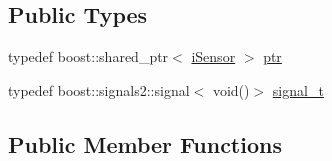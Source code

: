 \subsection*{Public Types}
\begin{DoxyCompactItemize}
\item 
typedef boost\+::shared\+\_\+ptr$<$ \hyperlink{classo_cpt_1_1i_sensor}{i\+Sensor} $>$ \hyperlink{classo_cpt_1_1i_sensor_a03533d2c5dc66e332d70dbb3b5e3006a}{ptr}
\item 
typedef boost\+::signals2\+::signal$<$ void()$>$ \hyperlink{classo_cpt_1_1i_sensor_a2e6d170acbc05f0b557bb68671813f6d}{signal\+\_\+t}
\end{DoxyCompactItemize}
\subsection*{Public Member Functions}
